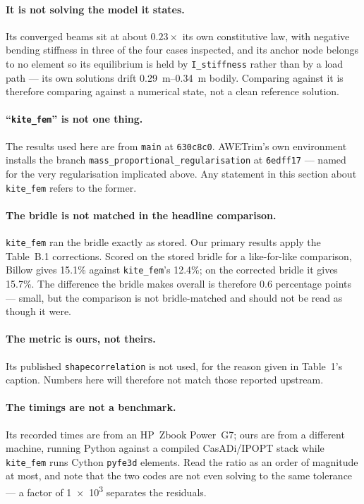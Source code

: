 \documentclass[11pt,a4paper]{article}
\begin{document}
\paragraph{It is not solving the model it states.} Its converged beams sit at
about $0.23\times$ its own constitutive law, with negative bending stiffness in
three of the four cases inspected, and its anchor node belongs to no element so
its equilibrium is held by \texttt{I\_stiffness} rather than by a load path ---
its own solutions drift \SIrange{0.29}{0.34}{m} bodily. Comparing against it is
therefore comparing against a numerical state, not a clean reference solution.

\paragraph{``\texttt{kite\_fem}'' is not one thing.} The results used here are
from \texttt{main} at \texttt{630c8c0}. AWETrim's own environment installs the
branch \texttt{mass\_proportional\_regularisation} at \texttt{6edff17} --- named
for the very regularisation implicated above. Any statement in this section about
\texttt{kite\_fem} refers to the former.

\paragraph{The bridle is not matched in the headline comparison.}
\texttt{kite\_fem} ran the bridle exactly as stored. Our primary results apply
the Table~B.1 corrections. Scored on the stored bridle for a like-for-like
comparison, Billow gives 15.1\% against \texttt{kite\_fem}'s 12.4\%; on the
corrected bridle it gives 15.7\%. The difference the bridle makes overall is
therefore \SI{0.6}{} percentage points --- small, but the comparison is not
bridle-matched and should not be read as though it were.

\paragraph{The metric is ours, not theirs.} Its published
\texttt{shapecorrelation} is not used, for the reason given in Table~1's
caption. Numbers here will therefore not match those reported upstream.

\paragraph{The timings are not a benchmark.} Its recorded times are from an
HP~Zbook Power~G7; ours are from a different machine, running Python against a
compiled CasADi/IPOPT stack while \texttt{kite\_fem} runs Cython
\texttt{pyfe3d} elements. Read the ratio as an order of magnitude at most, and
note that the two codes are not even solving to the same tolerance --- a factor
of \num{1e3} separates the residuals.
\end{document}
